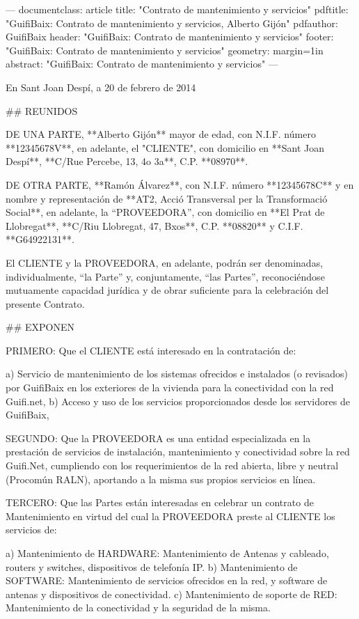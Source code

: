 ---
documentclass: article
title: "Contrato de mantenimiento y servicios"
pdftitle: "GuifiBaix: Contrato de mantenimiento y servicios, Alberto Gijón"
pdfauthor: GuifiBaix
header: "GuifiBaix: Contrato de mantenimiento y servicios"
footer:	"GuifiBaix: Contrato de mantenimiento y servicios"
geometry: margin=1in
abstract: "GuifiBaix: Contrato de mantenimiento y servicios"
---

En Sant Joan Despí, a 20 de febrero de 2014


## REUNIDOS

DE UNA  PARTE,
**Alberto Gijón** mayor de edad,
con N.I.F. número **12345678V**,
en adelante, el "CLIENTE",
con domicilio en **Sant Joan Despí**,
**C/Rue Percebe, 13, 4o 3a**,
C.P. **08970**.

DE OTRA  PARTE,
**Ramón Álvarez**,
con N.I.F. número **12345678C**
y en nombre y representación de **AT2, Acció Transversal per la Transformació Social**,
en adelante, la “PROVEEDORA”,
con domicilio en **El Prat de Llobregat**,
**C/Riu Llobregat, 47, Bxos**,
C.P. **08820**
y C.I.F. **G64922131**.

El CLIENTE y la PROVEEDORA, en adelante, podrán ser denominadas,
individualmente, “la Parte” y, conjuntamente, “las Partes”,
reconociéndose mutuamente capacidad jurídica y de obrar suficiente
para la celebración del presente Contrato.

## EXPONEN

PRIMERO: Que el CLIENTE está interesado en la contratación de:

a) Servicio de mantenimiento de los sistemas ofrecidos e instalados (o revisados) por GuifiBaix en los exteriores de la vivienda para la conectividad con la red Guifi.net,
b) Acceso y uso de los servicios proporcionados desde los servidores de GuifiBaix,

SEGUNDO: Que la PROVEEDORA es una entidad especializada en la prestación de servicios de instalación, mantenimiento y conectividad sobre la red Guifi.Net, cumpliendo
con los requerimientos de la red abierta, libre y neutral (Procomún RALN), aportando a la misma sus propios servicios en línea.

TERCERO: Que las Partes están interesadas en celebrar un contrato de Mantenimiento en virtud del cual la PROVEEDORA preste al CLIENTE los servicios de:

a) Mantenimiento de HARDWARE: Mantenimiento de Antenas y cableado, routers y switches, dispositivos de telefonía IP.
b) Mantenimiento de SOFTWARE: Mantenimiento de servicios ofrecidos en la red, y software de antenas y dispositivos de conectividad.
c) Mantenimiento de soporte de RED: Mantenimiento de la conectividad y la seguridad de la misma.


